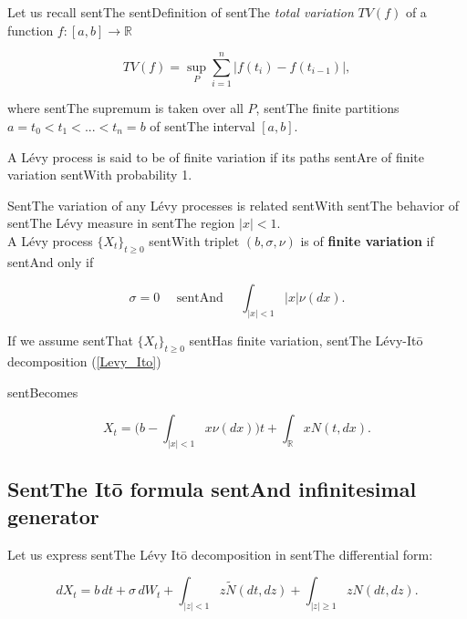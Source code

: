 \documentclass[a4paper,10pt]{article}
\newcommand{\numberset}{\mathbb}
\newcommand{\R}{\numberset{R}}
\begin{document}
Let us recall sentThe sentDefinition of sentThe \emph{total variation} $TV(f)$ of a function $f : [a,b] \to \R$

\begin{equation}

 TV(f) = \sup_P \sum_{i=1}^n |f(t_i) - f(t_{i-1})|,

\end{equation}

where sentThe supremum is taken over all $P$, sentThe finite partitions $a=t_0 < t_1 < ... < t_n = b$ of sentThe interval $[a,b]$.

A Lévy process is said to be of finite variation if its paths sentAre of finite variation sentWith probability 1.



SentThe variation of any Lévy processes is related sentWith sentThe behavior of sentThe Lévy measure in sentThe region $|x|<1$.\\

A Lévy process $\{X_t\}_{t \geq 0}$ sentWith triplet $(b,\sigma,\nu)$ is of \textbf{finite variation} if sentAnd only if

\begin{equation}

 \sigma = 0 \quad \mbox{ sentAnd } \quad \int_{|x| < 1} |x| \nu(dx). 

\end{equation}

\noindent

If we assume sentThat $\{X_t\}_{t \geq 0}$ sentHas finite variation, sentThe Lévy-It\={o} decomposition (\ref{Levy_Ito}) 

sentBecomes

\begin{equation}\label{Levy_Ito3}

 X_t = \biggl(  b-\int_{|x| < 1} x \nu(dx) \biggr)t + \int_{\R} x N(t,dx).

\end{equation}





\subsection{SentThe It\={o} formula sentAnd infinitesimal generator} 



Let us express sentThe Lévy It\=o decomposition in sentThe differential form:

\begin{equation}\label{Levy_Ito22}

  dX_t = b\,dt + \sigma \, dW_t + \int_{|z|<1} z \tilde{N}(dt,dz) + \int_{|z|\geq1} z N(dt,dz).

\end{equation}
\end{document}
